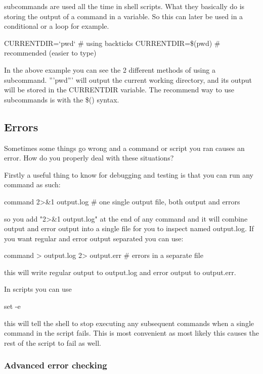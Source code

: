subcommands are used all the time in shell scripts. What they basically do is
storing the output of a command in a variable. So this can later be used in a
conditional or a loop for example.

\begin{prompt}
  CURRENTDIR=`pwd`  # using backticks
  CURRENTDIR=\$(pwd)  # recommended (easier to type)
\end{prompt}

In the above example you can see the 2 different methods of using a subcommand.
'''pwd''' will output the current working directory, and its output will be
stored in the CURRENTDIR variable.  The recommend way to use subcommands is with
the \$() syntax.

\subsection{Errors}

Sometimes some things go wrong and a command or script you ran causes an error.
How do you properly deal with these situations?

Firstly a useful thing to know for debugging and testing is that you can run any
command as such:

\begin{prompt}
command 2>{}&1 output.log   # one single output file, both output and errors
\end{prompt}

so you add "2>\&1 output.log" at the end of any command and it will combine
output and error output into a single file for you to inspect named output.log.
If you want regular and error output separated you can use:

\begin{prompt}
command >{} output.log 2>{} output.err  # errors in a separate file
\end{prompt}

this will write regular output to output.log and error output to output.err.

In scripts you can use

\begin{prompt}
set -e
\end{prompt}

this will tell the shell to stop executing any subsequent commands when a single
command in the script fails. This is most convenient as most likely this causes
the rest of the script to fail as well.

\subsubsection{Advanced error checking}


